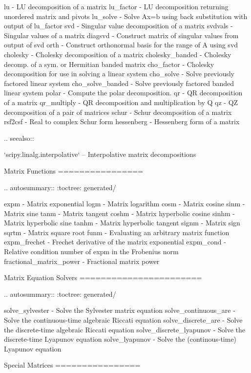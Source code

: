 \begin{DoxyVerb}
   lu - LU decomposition of a matrix
   lu_factor - LU decomposition returning unordered matrix and pivots
   lu_solve - Solve Ax=b using back substitution with output of lu_factor
   svd - Singular value decomposition of a matrix
   svdvals - Singular values of a matrix
   diagsvd - Construct matrix of singular values from output of svd
   orth - Construct orthonormal basis for the range of A using svd
   cholesky - Cholesky decomposition of a matrix
   cholesky_banded - Cholesky decomp. of a sym. or Hermitian banded matrix
   cho_factor - Cholesky decomposition for use in solving a linear system
   cho_solve - Solve previously factored linear system
   cho_solve_banded - Solve previously factored banded linear system
   polar - Compute the polar decomposition.
   qr - QR decomposition of a matrix
   qr_multiply - QR decomposition and multiplication by Q
   qz - QZ decomposition of a pair of matrices
   schur - Schur decomposition of a matrix
   rsf2csf - Real to complex Schur form
   hessenberg - Hessenberg form of a matrix

.. seealso::

   `scipy.linalg.interpolative` -- Interpolative matrix decompositions


Matrix Functions
================

.. autosummary::
   :toctree: generated/

   expm - Matrix exponential
   logm - Matrix logarithm
   cosm - Matrix cosine
   sinm - Matrix sine
   tanm - Matrix tangent
   coshm - Matrix hyperbolic cosine
   sinhm - Matrix hyperbolic sine
   tanhm - Matrix hyperbolic tangent
   signm - Matrix sign
   sqrtm - Matrix square root
   funm - Evaluating an arbitrary matrix function
   expm_frechet - Frechet derivative of the matrix exponential
   expm_cond - Relative condition number of expm in the Frobenius norm
   fractional_matrix_power - Fractional matrix power


Matrix Equation Solvers
=======================

.. autosummary::
   :toctree: generated/

   solve_sylvester - Solve the Sylvester matrix equation
   solve_continuous_are - Solve the continuous-time algebraic Riccati equation
   solve_discrete_are - Solve the discrete-time algebraic Riccati equation
   solve_discrete_lyapunov - Solve the discrete-time Lyapunov equation
   solve_lyapunov - Solve the (continous-time) Lyapunov equation


Special Matrices
================


\end{DoxyVerb}
